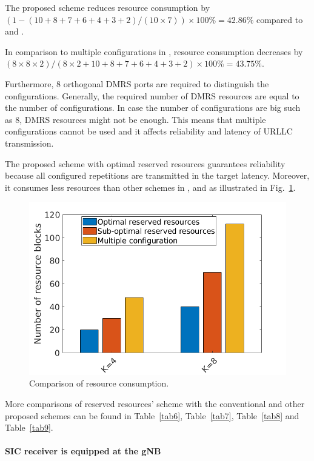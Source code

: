 \documentclass{ieeeaccess}
\begin{document}
The proposed scheme reduces resource consumption by $(1 - (10+8+7+6+4+3+2)/(10\times7)) \times100\% = 42.86\%$ compared to \cite{ref10} and \cite{ref11}.

In comparison to multiple configurations in \cite{ref7}, resource consumption decreases by $(8\times8\times2)/(8\times2+10+8+7+6+4+3+2)\times100\% = 43.75\%$. 

Furthermore, 8 orthogonal DMRS ports are required to distinguish the configurations. Generally, the required number of DMRS resources are equal to the number of configurations. In case the number of configurations are big such as 8, DMRS resources might not be enough. This means that multiple configurations cannot be used and it affects reliability and latency of URLLC transmission.

The proposed scheme with optimal reserved resources guarantees reliability because all configured repetitions are transmitted in the target latency. Moreover, it consumes less resources than other schemes in \cite{ref7}, \cite{ref10} and \cite{ref11} as illustrated in Fig.~\ref{fig19}. 

\begin{figure}[htbp]
\centerline{\includegraphics[scale=0.4]{fig19.png}}
\caption{Comparison of resource consumption.}
\label{fig19}
\vspace{-2mm}
\end{figure}

More comparisons of reserved resources' scheme with the conventional and other proposed schemes can be found in Table~\ref{tab6}, Table~\ref{tab7}, Table~\ref{tab8} and Table~\ref{tab9}.

\paragraph{SIC receiver is equipped at the gNB}\label{IVB2}
\end{document}

